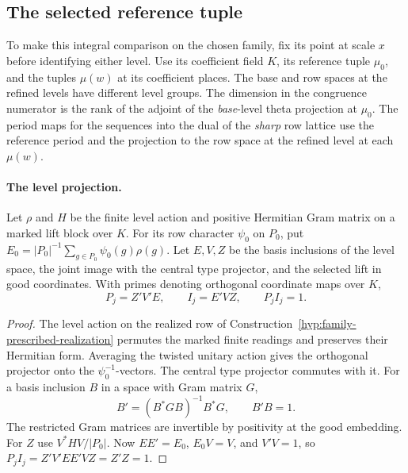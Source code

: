 \subsection{The selected reference tuple}\label{subsec:selected-period}
\hypertarget{source-selected-period}{}

To make this integral comparison on the chosen family, fix its point at scale \(x\) before identifying either level. Use its
coefficient field \(K\), its reference tuple \(\mu_0\), and the
tuples \(\mu(w)\) at its coefficient places. The base and row spaces at the refined levels have different level groups. The dimension in the
congruence numerator is the rank of the adjoint of the
\emph{base}-level theta projection at \(\mu_0\). The period maps for the sequences
into the dual of the \emph{sharp} row lattice use the reference
period and the projection to the row space at the refined level at each \(\mu(w)\).

\paragraph{The level projection.}
\begin{established}\label{hyp:reference-level-projection}\label{cor:selected-period-1}
Let \(\rho\) and \(H\) be the finite level action and positive Hermitian
Gram matrix on a marked lift block over \(K\). For its row character
\(\psi_0\) on \(P_0\), put \(E_0=|P_0|^{-1}\sum_{g\in P_0}\psi_0(g)\rho(g)\).
Let \(E,V,Z\) be the basis inclusions of the level space, the joint image with
the central type projector, and the selected lift in good coordinates.
With primes denoting orthogonal coordinate maps over \(K\),
\[
 P_j=Z'V'E,\qquad I_j=E'VZ,\qquad P_j I_j=1.
\]
\end{established}
\begin{proof}
The level action on the realized row of
Construction~\ref{hyp:family-prescribed-realization} permutes the
marked finite readings and preserves their Hermitian form.
Averaging the twisted unitary action gives the orthogonal projector
onto the \(\psi_0^{-1}\)-vectors. The central type projector commutes
with it. For a basis inclusion \(B\) in a space with Gram matrix \(G\),
\[
 B'=(B^*GB)^{-1}B^*G,\qquad B'B=1 .
\]
The restricted Gram matrices are invertible by positivity at the good
embedding. For \(Z\) use \(V^*HV/|P_0|\). Now \(EE'=E_0\),
\(E_0V=V\), and \(V'V=1\), so \(P_jI_j=Z'V'EE'VZ=Z'Z=1\).
\end{proof}

